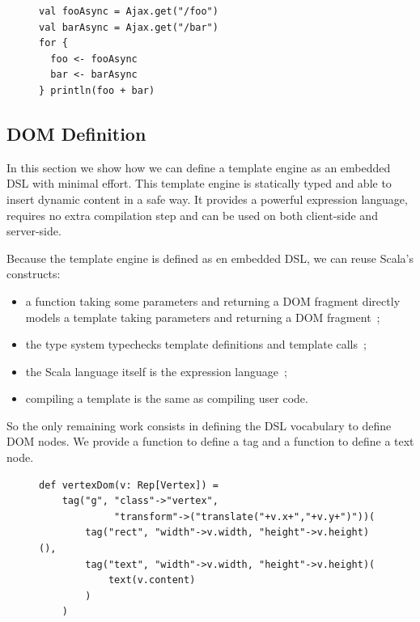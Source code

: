 \documentclass[american,english,runningheads]{llncs}
\begin{document}
\begin{figure}
\begin{lstlisting}[caption=Parallel computations in Scala,label=async-parallel-1]
val fooAsync = Ajax.get("/foo")
val barAsync = Ajax.get("/bar")
for {
  foo <- fooAsync
  bar <- barAsync
} println(foo + bar)
\end{lstlisting}
\end{figure}

\subsection{DOM Definition}

In this section we show how we can define a template engine as an embedded DSL with minimal effort. This template
engine is statically typed and able to insert dynamic content in a safe way. It provides a powerful expression
language, requires no extra compilation step and can be used on both client-side and server-side.

Because the template engine is defined as en embedded DSL, we can reuse Scala’s constructs:

\begin{itemize}
\item a function taking some parameters and returning a DOM fragment directly models a template taking parameters and
returning a DOM fragment~;
\item the type system typechecks template definitions and template calls~;
\item the Scala language itself is the expression language~;
\item compiling a template is the same as compiling user code.
\end{itemize}

So the only remaining work consists in defining the DSL vocabulary to define DOM nodes. We provide a 
function to define a tag and a  function to define a text node.

\begin{figure}
\begin{lstlisting}[label=forest-hello,caption=DOM definition DSL]
def vertexDom(v: Rep[Vertex]) =
    tag("g", "class"->"vertex",
             "transform"->("translate("+v.x+","+v.y+")"))(
        tag("rect", "width"->v.width, "height"->v.height)(),
        tag("text", "width"->v.width, "height"->v.height)(
            text(v.content)
        )
    )
\end{lstlisting}
\end{figure}
\end{document}
